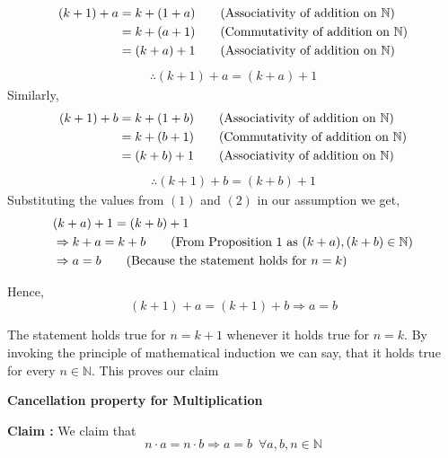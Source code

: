 \documentclass[10pt]{article}
\newcommand{\nn}{\mathbb{N}}
\begin{document}
        \begin{align*}
        (k+1)+a & = k + (1 + a) \tag{Associativity of addition on $\nn$}\\
         & = k + (a + 1) \tag{Commutativity of addition on $\nn$}\\
         & = (k + a) + 1 \tag{Associativity of addition on $\nn$}
        \end{align*}
        \begin{align*}
            \therefore (k + 1) + a = (k + a) + 1 \tag{2}
        \end{align*}
        Similarly, 
        \begin{align*} 
        (k+1)+b & = k + (1 + b) \tag{Associativity of addition on $\nn$}\\
         & = k + (b + 1) \tag{Commutativity of addition on $\nn$}\\
         & = (k + b) + 1 \tag{Associativity of addition on $\nn$}
        \end{align*}
        \begin{align*}
            \therefore (k + 1) + b = (k + b) + 1 \tag{1}
        \end{align*}
        Substituting the values from $(1)$ and $(2)$ in our assumption we get,
        \begin{align*}
            & (k + a) + 1 = (k + b) + 1\\
            &\Rightarrow k + a = k + b \tag{From Proposition 1 as $(k + a), (k + b) \in \nn$}\\
            &\Rightarrow a = b \tag{Because the statement holds for $n = k$}\\
        \end{align*}

        Hence, $$(k + 1) + a = (k + 1) + b \Rightarrow a = b$$

        The statement holds true for $n = k + 1$ whenever it holds true for $n = k$. By invoking the principle of mathematical induction we can say, that it holds true for every $n \in \nn$. This proves our claim
        \clearpage
        \begin{center}
            \Large{\textbf{Cancellation property for Multiplication}}
        \end{center}
        \vspace{20pt}
        \textbf{Claim : }We claim that $$n \cdot a = n \cdot b \Rightarrow a = b \,\,\, \forall a, b, n \in \nn$$
\end{document}
